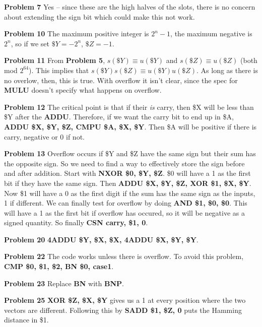 \vskip 0.1in
\noindent
{\bf Problem 7} Yes -- since these are the high halves of the slots, there is no
concern about extending the sign bit which could make this not work.

\vskip 0.1in
\noindent
{\bf Problem 10} The maximum positive integer is $2^n-1$, the maximum negative
is $2^n$, so if we set $\$Y = -2^n$, $\$Z=-1$.

\vskip 0.1in
\noindent
{\bf Problem 11} From {\bf Problem 5}, $s\left(\$Y\right) \equiv u\left(\$Y\right)$
 and $s\left(\$Z\right) \equiv u\left(\$Z\right)$ (both mod $2^{64}$).  This implies
 that $s\left(\$Y\right) s\left(\$Z\right) \equiv u\left(\$Y\right) u\left(\$Z\right)$.
 As long as there is no overlow, then, this is true.  With overflow it isn't clear, 
 since the spec for {\bf MULU} doesn't specify what happens on overflow.
 
\vskip 0.1in
 \noindent
 {\bf Problem 12} The critical point is that if their {\it is} carry, then 
 \$X will be less than \$Y after the {\bf ADDU}.  Therefore, if we want
 the carry bit to end up in \$A, {\bf ADDU \$X, \$Y, \$Z, CMPU \$A, \$X, \$Y}.
 Then \$A will be positive if there is carry, negative or 0 if not.

\vskip 0.1in
\noindent
{\bf Problem 13} Overflow occurs if \$Y and \$Z have the same sign
but their sum has the opposite sign.  So we need to find a way to
effectively store the sign before and after addition.  Start with
{\bf NXOR \$0, \$Y, \$Z}.  \$0 will have a 1 as the first bit if they
have the same sign.  Then  {\bf ADDU \$X, \$Y, \$Z, XOR \$1, \$X, \$Y}.
Now \$1 will have a 0 as the first digit if the sum has the same sign 
as the inputs, 1 if different.  We can finally test for overflow by doing 
{\bf AND \$1, \$0, \$0}.  This will have a 1 as the first bit if overflow
has occured, so it will be negative as a signed quantity.  So finally
{\bf CSN carry, \$1, 0}.
 
\vskip 0.1in
 \noindent
{\bf Problem 20} {\bf 4ADDU \$Y, \$X, \$X, 4ADDU \$X, \$Y, \$Y}.

\vskip 0.1in
\noindent
{\bf Problem 22} The code works unless there is overflow.  To avoid
this problem, {\bf CMP \$0, \$1, \$2, BN \$0, case1}.  

\vskip 0.1in
\noindent
{\bf Problem 23} Replace {\bf BN} with {\bf BNP}.

\vskip 0.1in
\noindent
{\bf Problem 25} {\bf XOR \$Z, \$X, \$Y} gives us a 1 at every
position where the two vectors are different.  Following this 
by {\bf SADD \$1, \$Z, 0} puts the Hamming distance in \$1.

